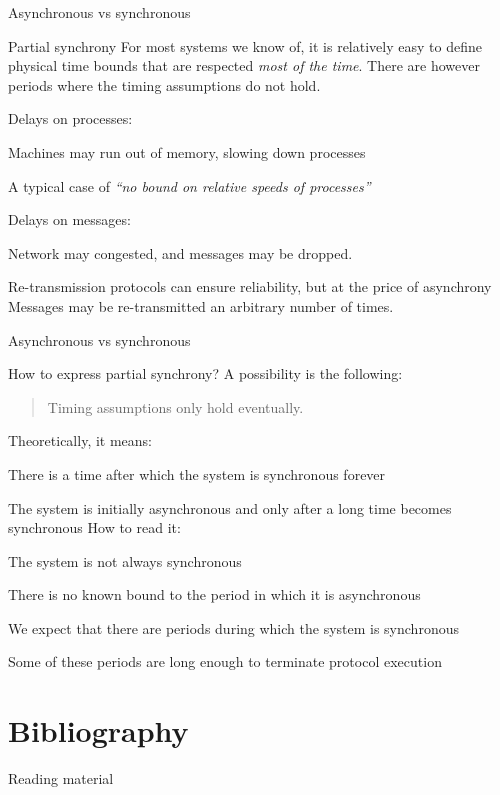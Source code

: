 \begin{frame}{Asynchronous vs synchronous}

\begin{block}{Partial synchrony}
For most systems we know of, it is relatively easy to define physical time bounds that
are respected {\em most of the time}. There are however periods where the timing assumptions
do not hold.
\end{block}

\BIL
\item Delays on processes:
\BI
\item Machines may run out of memory, slowing down processes
\item A typical case of {\em ``no bound on relative speeds of processes''}
\EI

\item Delays on messages:
\BI
\item Network may congested, and messages may be dropped.
\item Re-transmission protocols can ensure reliability, but at the price of asynchrony\\
  Messages may be re-transmitted an arbitrary number of times.
\EI
\EIL
{}

\end{frame}

\begin{frame}{Asynchronous vs synchronous}
	
How to express partial synchrony? A possibility is the following:
\begin{quote}
  Timing assumptions only hold \alert{eventually}.
\end{quote}
\alert{Theoretically, it means:}
\BI
\item There is a time after which the system is synchronous forever
\item The system is initially asynchronous and only after a long time becomes synchronous
\EI
\alert{How to read it:}
\BI
\item The system is not always synchronous
\item There is no known bound to the period in which it is asynchronous
\item We expect that there are periods during which the system is synchronous
\item Some of these periods are long enough to terminate protocol execution
\EI
\end{frame}

\section{Bibliography}


\begin{frame}{Reading material}

{\footnotesize

  
}

\end{frame}


 
